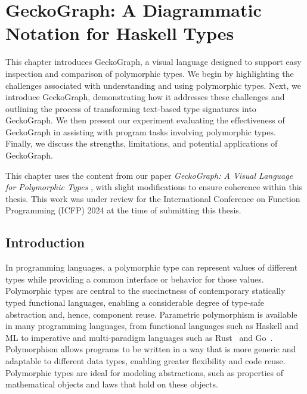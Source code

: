 


\chapter{GeckoGraph: A Diagrammatic Notation for Haskell Types}

\label{chap:gecko-graph} 
\graphicspath{{Figures/GeckoGraph}}

This chapter introduces GeckoGraph, a visual language designed to support easy inspection and comparison of polymorphic types. We begin by highlighting the challenges associated with understanding and using polymorphic types. Next, we introduce GeckoGraph, demonstrating how it addresses these challenges and outlining the process of transforming text-based type signatures into GeckoGraph. We then present our experiment evaluating the effectiveness of GeckoGraph in assisting with program tasks involving polymorphic types. Finally, we discuss the strengths, limitations, and potential applications of GeckoGraph.  

 This chapter uses the content from our paper \textit{GeckoGraph: A Visual Language for Polymorphic Types} \cite{Fu2024-jq}, with slight modifications to ensure coherence within this thesis. This work was under review for the International Conference on Function Programming (ICFP) 2024 at the time of submitting this thesis.

\section{Introduction} \label{sec:intro}
In programming languages, a polymorphic type \cite{Cardelli1987-fp} can represent values of different types while providing a common interface or behavior for those values. Polymorphic types are central to the succinctness of contemporary statically typed functional languages, enabling a considerable degree of type-safe abstraction and, hence, component reuse. Parametric polymorphism is available in many programming languages, from functional languages such as Haskell and ML to imperative and multi-paradigm languages such as Rust~\cite{Klabnik_undated-wx} and Go~\cite{Griesemer_undated-ff}. Polymorphism allows programs to be written in a way that is more generic and adaptable to different data types, enabling greater flexibility and code reuse. Polymorphic types are ideal for modeling abstractions, such as properties of mathematical objects and laws that hold on these objects. 


